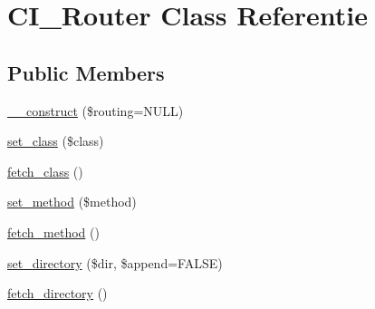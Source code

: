 \hypertarget{class_c_i___router}{}\section{C\+I\+\_\+\+Router Class Referentie}
\label{class_c_i___router}
\subsection*{Public Members}
\begin{DoxyCompactItemize}
\item 
\mbox{\hyperlink{class_c_i___router_a9b81050c9907794a374f5088743a0252}{\+\_\+\+\_\+construct}} (\$routing=N\+U\+LL)
\item 
\mbox{\hyperlink{class_c_i___router_afbb540df5c161fe69909a5f8182f910f}{set\+\_\+class}} (\$class)
\item 
\mbox{\hyperlink{class_c_i___router_af5586c3f514021e9e2588e102620d237}{fetch\+\_\+class}} ()
\item 
\mbox{\hyperlink{class_c_i___router_a6a42036a115946acdaf0975c994106fb}{set\+\_\+method}} (\$method)
\item 
\mbox{\hyperlink{class_c_i___router_ad408b28e3a095e7435f21e95d93e7714}{fetch\+\_\+method}} ()
\item 
\mbox{\hyperlink{class_c_i___router_a80573f758526ffa1beba61be5d45baff}{set\+\_\+directory}} (\$dir, \$append=F\+A\+L\+SE)
\item 
\mbox{\hyperlink{class_c_i___router_a7a089f2cfae731dcc9e59a71d20208ef}{fetch\+\_\+directory}} ()
\end{DoxyCompactItemize}

